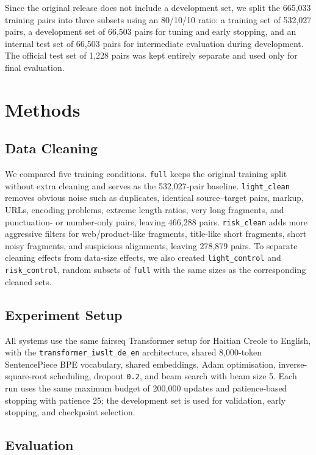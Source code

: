 \documentclass[11pt]{article}
\begin{document}
Since the original release does not include a development set, we split the 665,033 training pairs into three subsets using an 80/10/10 ratio: a training set of 532,027 pairs, a development set of 66,503 pairs for tuning and early stopping, and an internal test set of 66,503 pairs for intermediate evaluation during development. The official test set of 1,228 pairs was kept entirely separate and used only for final evaluation.

\section{Methods}

\subsection{Data Cleaning}

We compared five training conditions. \texttt{full} keeps the original training split without extra cleaning and serves as the 532,027-pair baseline. \texttt{light\_clean} removes obvious noise such as duplicates, identical source--target pairs, markup, URLs, encoding problems, extreme length ratios, very long fragments, and punctuation- or number-only pairs, leaving 466,288 pairs. \texttt{risk\_clean} adds more aggressive filters for web/product-like fragments, title-like short fragments, short noisy fragments, and suspicious alignments, leaving 278,879 pairs. To separate cleaning effects from data-size effects, we also created \texttt{light\_control} and \texttt{risk\_control}, random subsets of \texttt{full} with the same sizes as the corresponding cleaned sets.

\subsection{Experiment Setup}

All systems use the same fairseq Transformer setup for Haitian Creole to English, with the \texttt{transformer\_iwslt\_de\_en} architecture, shared 8,000-token SentencePiece BPE vocabulary, shared embeddings, Adam optimisation, inverse-square-root scheduling, dropout \texttt{0.2}, and beam search with beam size 5. Each run uses the same maximum budget of 200,000 updates and patience-based stopping with patience 25; the development set is used for validation, early stopping, and checkpoint selection.

\subsection{Evaluation}
\end{document}
